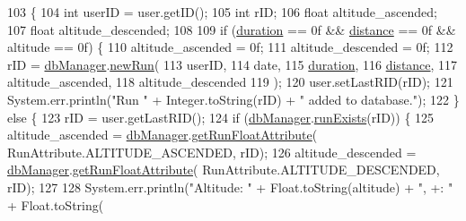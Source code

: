 \begin{DoxyCode}
103                                                                                                \{
104         \textcolor{keywordtype}{int} userID = user.getID();
105         \textcolor{keywordtype}{int} rID;
106         \textcolor{keywordtype}{float} altitude\_ascended;
107         \textcolor{keywordtype}{float} altitude\_descended;
108 
109         \textcolor{keywordflow}{if} (\mbox{\hyperlink{classcom_1_1activitytracker_1_1_run_a5e38d293d29d4b65c9290ff4bee82e03}{duration}} == 0f && \mbox{\hyperlink{classcom_1_1activitytracker_1_1_run_a7b4ca8c4ecea4da1653f03b8c8fc16a8}{distance}} == 0f && altitude == 0f) \{
110             altitude\_ascended = 0f;
111             altitude\_descended = 0f;
112             rID = \mbox{\hyperlink{classcom_1_1activitytracker_1_1_run_ab90e32eda9f4c671ae3575f971edca6b}{dbManager}}.\mbox{\hyperlink{classcom_1_1activitytracker_1_1_d_b_manager_ae0504a939b6f165aa5c3cca9eb8df049}{newRun}}(
113                     userID,
114                     date,
115                     \mbox{\hyperlink{classcom_1_1activitytracker_1_1_run_a5e38d293d29d4b65c9290ff4bee82e03}{duration}},
116                     \mbox{\hyperlink{classcom_1_1activitytracker_1_1_run_a7b4ca8c4ecea4da1653f03b8c8fc16a8}{distance}},
117                     altitude\_ascended,
118                     altitude\_descended
119             );
120             user.setLastRID(rID);
121             System.err.println(\textcolor{stringliteral}{"Run "} + Integer.toString(rID) + \textcolor{stringliteral}{" added to database."});
122         \} \textcolor{keywordflow}{else} \{
123             rID = user.getLastRID();
124             \textcolor{keywordflow}{if} (\mbox{\hyperlink{classcom_1_1activitytracker_1_1_run_ab90e32eda9f4c671ae3575f971edca6b}{dbManager}}.\mbox{\hyperlink{classcom_1_1activitytracker_1_1_d_b_manager_a723ac1c573bacdd0b62894357bd65a9b}{runExists}}(rID)) \{
125                 altitude\_ascended = \mbox{\hyperlink{classcom_1_1activitytracker_1_1_run_ab90e32eda9f4c671ae3575f971edca6b}{dbManager}}.\mbox{\hyperlink{classcom_1_1activitytracker_1_1_d_b_manager_a666452f1e5862f90c06b0beb9a9fcfdd}{getRunFloatAttribute}}(
      RunAttribute.ALTITUDE\_ASCENDED, rID);
126                 altitude\_descended = \mbox{\hyperlink{classcom_1_1activitytracker_1_1_run_ab90e32eda9f4c671ae3575f971edca6b}{dbManager}}.\mbox{\hyperlink{classcom_1_1activitytracker_1_1_d_b_manager_a666452f1e5862f90c06b0beb9a9fcfdd}{getRunFloatAttribute}}(
      RunAttribute.ALTITUDE\_DESCENDED, rID);
127 
128                 System.err.println(\textcolor{stringliteral}{"Altitude: "} + Float.toString(altitude) + \textcolor{stringliteral}{", +: "} + Float.toString(

\end{DoxyCode}
